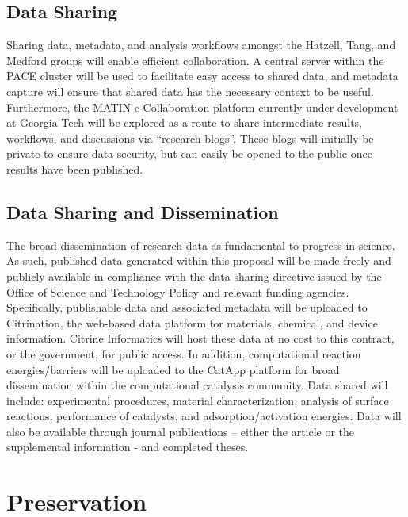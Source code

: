 \subsection{Data Sharing}
Sharing data, metadata, and analysis workflows amongst the Hatzell, Tang, and Medford groups will enable efficient collaboration. A central server within the PACE cluster will be used to facilitate easy access to shared data, and metadata capture will ensure that shared data has the necessary context to be useful. Furthermore, the MATIN e-Collaboration platform currently under development at Georgia Tech will be explored as a route to share intermediate results, workflows, and discussions via “research blogs”. These blogs will initially be private to ensure data security, but can easily be opened to the public once results have been published.

\subsection{Data Sharing and Dissemination}
The broad dissemination of research data as fundamental to progress in science. As such, published data generated within this proposal will be made freely and publicly available in compliance with the data sharing directive issued by the Office of Science and Technology Policy and relevant funding agencies. Specifically, publishable data and associated metadata will be uploaded to Citrination, the web-based data platform for materials, chemical, and device information. Citrine Informatics will host these data at no cost to this contract, or the government, for public access. In addition, computational reaction energies/barriers will be uploaded to the CatApp platform for broad dissemination within the computational catalysis community. Data shared will include: experimental procedures, material characterization, analysis of surface reactions, performance of catalysts, and adsorption/activation energies.  Data will also be available through journal publications – either the article or the supplemental information - and completed theses.


\section{Preservation}
